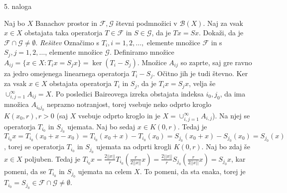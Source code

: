 \documentclass[a4paper, 12pt]{article}
\begin{document}
\begin{flushleft}
5. naloga
\end{flushleft}
Naj bo $X$ Banachov prostor in $\mathcal{F}, \mathcal{G}$ števni podmnožici v $\mathcal{B}(X)$. Naj za vsak $x\in X$ obstajata taka operatorja $T\in \mathcal{F}$ in $S\in \mathcal{G}$, da je $Tx = Sx$. Dokaži, da je $\mathcal{F} \cap \mathcal{G} \neq \emptyset$.
\newline
\emph{Rešitev}
\newline
Označimo s $T_i, i=1,2,\dots,$ elemente množice $\mathcal{F}$ in s $S_j, j=1,2,\dots$, elemente množice $\mathcal{G}$. Definiramo množice $A_{ij} = \{x\in X: T_i x = S_jx\} = \ker(T_i - S_j)$. Množice $A_{ij}$ so zaprte, saj gre ravno za jedro omejenega linearnega operatorja $T_i-S_j$. Očitno jih je tudi števno. Ker za vsak $x\in X$ obstajata operatorja $T_i$ in $S_j$, da je $T_i x = S_j x$, velja še $\cup_{i,j=1}^{\infty} A_{ij} = X$. Po posledici Baireovega izreka obstajata indeksa $i_0, j_0$, da ima množica $A_{i_0 j_0}$ neprazno notranjost, torej vsebuje neko odprto kroglo $K(x_0,r),r>0$ (saj $X$ vsebuje odprto kroglo in je $X=\cup_{i,j=1}^{\infty} A_{i,j}$). Na njej se operatorja $T_{i_0}$ in $S_{j_0}$ ujemata. Naj bo sedaj $x\in K(0,r)$. Tedaj je $T_{i_0} x = T_{i_0}(x_0 + x - x_0)= T_{i_0} (x_0 + x) - T_{i_0}(x_0)= S_{j_0}(x_0+x)-S_{j_0}(x_0) = S_{j_0}(x)$, torej se operatorja $T_{i_0}$ in $S_{j_0}$ ujemata na odprti krogli $K(0,r)$. Naj bo zdaj še $x\in X$ poljuben. Tedaj je $T_{i_0}x = \frac{2||x||}{r}T_{i_0}(\frac{r}{2||x||}x) =\frac{2||x||}{r}S_{j_0}(\frac{r}{2||x||}x) = S_{j_0}x$, kar pomeni, da se $T_{i_0}$ in $S_{j_0}$ ujemata na celem $X$. To pomeni, da sta enaka, torej je $T_{i_0} = S_{j_0}\in \mathcal{F}\cap \mathcal{G}\neq \emptyset$. 
\end{document}
